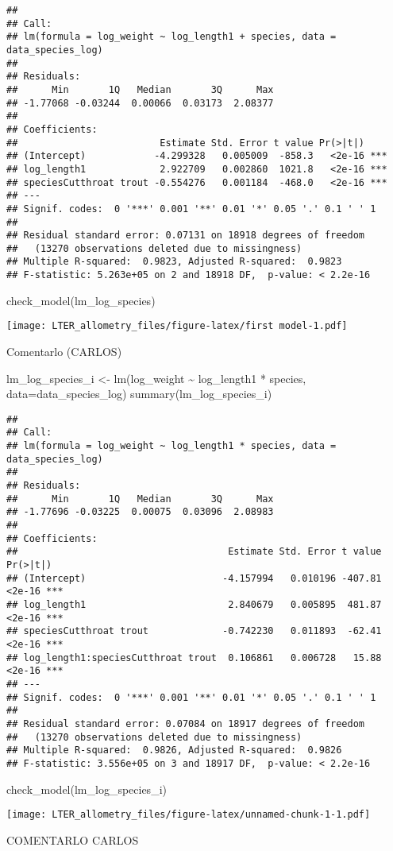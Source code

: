 \documentclass[
]{article}
\newenvironment{Shaded}{\begin{snugshade}}{\end{snugshade}}
\newcommand{\AttributeTok}[1]{\textcolor[rgb]{0.77,0.63,0.00}{#1}}
\newcommand{\FunctionTok}[1]{\textcolor[rgb]{0.00,0.00,0.00}{#1}}
\newcommand{\NormalTok}[1]{#1}
\newcommand{\OtherTok}[1]{\textcolor[rgb]{0.56,0.35,0.01}{#1}}
\newcommand{\SpecialCharTok}[1]{\textcolor[rgb]{0.00,0.00,0.00}{#1}}
\begin{document}
\begin{verbatim}
## 
## Call:
## lm(formula = log_weight ~ log_length1 + species, data = data_species_log)
## 
## Residuals:
##      Min       1Q   Median       3Q      Max 
## -1.77068 -0.03244  0.00066  0.03173  2.08377 
## 
## Coefficients:
##                         Estimate Std. Error t value Pr(>|t|)    
## (Intercept)            -4.299328   0.005009  -858.3   <2e-16 ***
## log_length1             2.922709   0.002860  1021.8   <2e-16 ***
## speciesCutthroat trout -0.554276   0.001184  -468.0   <2e-16 ***
## ---
## Signif. codes:  0 '***' 0.001 '**' 0.01 '*' 0.05 '.' 0.1 ' ' 1
## 
## Residual standard error: 0.07131 on 18918 degrees of freedom
##   (13270 observations deleted due to missingness)
## Multiple R-squared:  0.9823, Adjusted R-squared:  0.9823 
## F-statistic: 5.263e+05 on 2 and 18918 DF,  p-value: < 2.2e-16
\end{verbatim}

\begin{Shaded}
\begin{Highlighting}[]
\FunctionTok{check\_model}\NormalTok{(lm\_log\_species)}
\end{Highlighting}
\end{Shaded}

\texttt{[image: LTER\_allometry\_files/figure-latex/first model-1.pdf]}

Comentarlo (CARLOS)

\begin{Shaded}
\begin{Highlighting}[]
\NormalTok{lm\_log\_species\_i }\OtherTok{\textless{}{-}} \FunctionTok{lm}\NormalTok{(log\_weight }\SpecialCharTok{\textasciitilde{}}\NormalTok{ log\_length1 }\SpecialCharTok{*}\NormalTok{ species, }\AttributeTok{data=}\NormalTok{data\_species\_log)}
\FunctionTok{summary}\NormalTok{(lm\_log\_species\_i)}
\end{Highlighting}
\end{Shaded}

\begin{verbatim}
## 
## Call:
## lm(formula = log_weight ~ log_length1 * species, data = data_species_log)
## 
## Residuals:
##      Min       1Q   Median       3Q      Max 
## -1.77696 -0.03225  0.00075  0.03096  2.08983 
## 
## Coefficients:
##                                     Estimate Std. Error t value Pr(>|t|)    
## (Intercept)                        -4.157994   0.010196 -407.81   <2e-16 ***
## log_length1                         2.840679   0.005895  481.87   <2e-16 ***
## speciesCutthroat trout             -0.742230   0.011893  -62.41   <2e-16 ***
## log_length1:speciesCutthroat trout  0.106861   0.006728   15.88   <2e-16 ***
## ---
## Signif. codes:  0 '***' 0.001 '**' 0.01 '*' 0.05 '.' 0.1 ' ' 1
## 
## Residual standard error: 0.07084 on 18917 degrees of freedom
##   (13270 observations deleted due to missingness)
## Multiple R-squared:  0.9826, Adjusted R-squared:  0.9826 
## F-statistic: 3.556e+05 on 3 and 18917 DF,  p-value: < 2.2e-16
\end{verbatim}

\begin{Shaded}
\begin{Highlighting}[]
\FunctionTok{check\_model}\NormalTok{(lm\_log\_species\_i)}
\end{Highlighting}
\end{Shaded}

\texttt{[image: LTER\_allometry\_files/figure-latex/unnamed-chunk-1-1.pdf]}

COMENTARLO CARLOS
\end{document}
